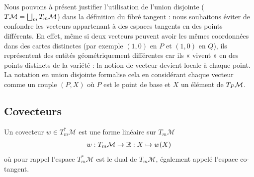 \begin{rmk}
    Nous pouvons à présent justifier l'utilisation de l'union disjointe ($T\mathcal{M} = \bigsqcup_m T_m\mathcal{M}$) dans la définition du fibré tangent : nous souhaitons éviter de confondre les vecteurs appartenant à des espaces tangents en des points différents. En effet, même si deux vecteurs peuvent avoir les mêmes coordonnées dans des cartes distinctes (par exemple $(1,0)$ en $P$ et $(1,0)$ en $Q$), ils représentent des entités géométriquement différentes car ils « vivent » en des points distincts de la variété : la notion de vecteur devient locale à chaque point. La notation en union disjointe formalise cela en considérant chaque vecteur comme un couple $(P,X)$ où $P$ est le point de base et $X$ un élément de $T_P\mathcal{M}$.
\end{rmk}
\subsection{Covecteurs}
Un covecteur $w\in T_m^*\mathcal{M}$ est une forme linéaire sur $T_m\mathcal{M}$ 
\begin{align}
w  :  T_m \mathcal{M} \to \mathbb{R} : X \mapsto w(X)
\end{align}
où pour rappel l'espace $T^*_m \mathcal{M}$ est le dual de $T_m\mathcal{M}$, également appelé l'espace co-tangent. 

